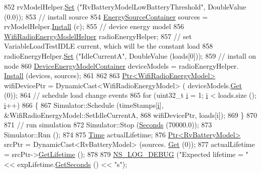 \begin{DoxyCode}
852   rvModelHelper.\hyperlink{classns3_1_1RvBatteryModelHelper_a28f5eedc180d45310324ca3bd1868af1}{Set} (\textcolor{stringliteral}{"RvBatteryModelLowBatteryThreshold"}, DoubleValue (0.0));
853   \textcolor{comment}{// install source}
854   \hyperlink{classns3_1_1EnergySourceContainer}{EnergySourceContainer} sources = rvModelHelper.\hyperlink{classns3_1_1EnergySourceHelper_ac52e48ef79c83537cc0bba02df8d91a1}{Install} (c);
855   \textcolor{comment}{// device energy model}
856   \hyperlink{classns3_1_1WifiRadioEnergyModelHelper}{WifiRadioEnergyModelHelper} radioEnergyHelper;
857   \textcolor{comment}{// set VariableLoadTestIDLE current, which will be the constant load}
858   radioEnergyHelper.\hyperlink{classns3_1_1WifiRadioEnergyModelHelper_a8fb76b591e426c6a8fcdc7fc411e3295}{Set} (\textcolor{stringliteral}{"IdleCurrentA"}, DoubleValue (loads[0]));
859   \textcolor{comment}{// install on node}
860   \hyperlink{classns3_1_1DeviceEnergyModelContainer}{DeviceEnergyModelContainer} deviceModels = radioEnergyHelper.
      \hyperlink{classns3_1_1DeviceEnergyModelHelper_a085a4854e96ff8f314a9ebec93e6c4eb}{Install} (devices, sources);
861 
862 
863   \hyperlink{classns3_1_1Ptr}{Ptr<WifiRadioEnergyModel>} wifiDevicePtr = DynamicCast<WifiRadioEnergyModel> (
      deviceModels.\hyperlink{classns3_1_1DeviceEnergyModelContainer_ab7b49acea017b91801a4e7067db56eba}{Get} (0));
864   \textcolor{comment}{// schedule load change events}
865   \textcolor{keywordflow}{for} (uint32\_t \hyperlink{bernuolliDistribution_8m_a6f6ccfcf58b31cb6412107d9d5281426}{i} = 1; \hyperlink{bernuolliDistribution_8m_a6f6ccfcf58b31cb6412107d9d5281426}{i} < loads.size (); \hyperlink{bernuolliDistribution_8m_a6f6ccfcf58b31cb6412107d9d5281426}{i}++)
866     \{
867       Simulator::Schedule (timeStamps[\hyperlink{bernuolliDistribution_8m_a6f6ccfcf58b31cb6412107d9d5281426}{i}], &WifiRadioEnergyModel::SetIdleCurrentA,
868                            wifiDevicePtr, loads[i]);
869     \}
870 
871   \textcolor{comment}{// run simulation}
872   Simulator::Stop (\hyperlink{group__timecivil_ga33c34b816f8ff6628e33d5c8e9713b9e}{Seconds} (70000.0));
873   Simulator::Run ();
874 
875   \hyperlink{classns3_1_1Time}{Time} actualLifetime;
876   \hyperlink{classns3_1_1Ptr}{Ptr<RvBatteryModel>} srcPtr = DynamicCast<RvBatteryModel> (sources.
      \hyperlink{classns3_1_1EnergySourceContainer_ac59e8c3dc22ecb142f3398dcd23c5c37}{Get} (0));
877   actualLifetime = srcPtr->\hyperlink{classns3_1_1RvBatteryModel_a0195713aa6eeb966f3189192b5fbeea1}{GetLifetime} ();
878 
879   \hyperlink{group__logging_ga413f1886406d49f59a6a0a89b77b4d0a}{NS\_LOG\_DEBUG} (\textcolor{stringliteral}{"Expected lifetime = "} << expLifetime.\hyperlink{classns3_1_1Time_a8f20d5c3b0902d7b4320982f340b57c8}{GetSeconds} () << \textcolor{stringliteral}{"s"});

\end{DoxyCode}
